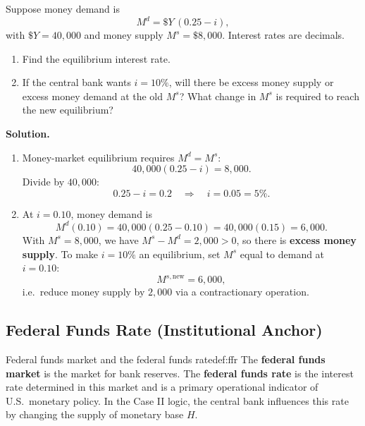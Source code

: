 \begin{examplebox}[title={Worked Example (Tutorial 2, Question 3): Equilibrium interest rate and a higher target}]
Suppose money demand is
\[
M^d = \$Y\,(0.25-i),
\]
with $\$Y=40{,}000$ and money supply $M^s=\$8{,}000$. Interest rates are decimals.
\begin{enumerate}[label=(\alph*)]
  \item Find the equilibrium interest rate.
  \item If the central bank wants $i=10\%$, will there be excess money supply or excess money demand at the old $M^s$?
        What change in $M^s$ is required to reach the new equilibrium?
\end{enumerate}

\textbf{Solution.}
\begin{enumerate}[label=(\alph*)]
  \item Money-market equilibrium requires $M^d=M^s$:
  \[
  40{,}000(0.25-i)=8{,}000.
  \]
  Divide by $40{,}000$:
  \[
  0.25-i=0.2
  \quad\Rightarrow\quad
  i=0.05=5\%.
  \]

  \item At $i=0.10$, money demand is
  \[
  M^d(0.10)=40{,}000(0.25-0.10)=40{,}000(0.15)=6{,}000.
  \]
  With $M^s=8{,}000$, we have $M^s-M^d=2{,}000>0$, so there is \textbf{excess money supply}.
  To make $i=10\%$ an equilibrium, set $M^s$ equal to demand at $i=0.10$:
  \[
  M^{s,\text{new}}=6{,}000,
  \]
  i.e.\ reduce money supply by $2{,}000$ via a contractionary operation.
\end{enumerate}
\end{examplebox}

\subsection{Federal Funds Rate (Institutional Anchor)}

\begin{definition}{Federal funds market and the federal funds rate}{def:ffr}
The \textbf{federal funds market} is the market for bank reserves.
The \textbf{federal funds rate} is the interest rate determined in this market and is a primary operational indicator of U.S.\ monetary policy.
In the Case II logic, the central bank influences this rate by changing the supply of monetary base $H$.
\end{definition}


